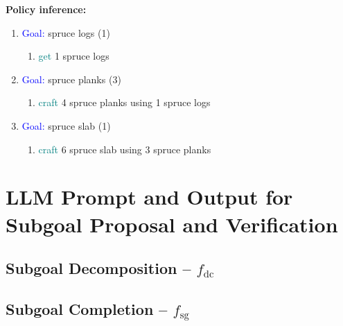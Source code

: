 \textbf{Policy inference:}
\begin{enumerate}[label=\textbf{Manager :}, leftmargin=2.4em, labelsep=.5em, align=left]
    \item \textcolor{blue}{Goal:} spruce logs (1)
    \begin{enumerate}[label=\textbf{Employee :}, leftmargin=2.8em, labelsep=.5em, align=left]
        \item \textcolor{teal}{get} 1 spruce logs
    \end{enumerate}

    \item \textcolor{blue}{Goal:} spruce planks (3)
    \begin{enumerate}[label=\textbf{Employee :}, leftmargin=2.8em, labelsep=.5em, align=left]
        \item \textcolor{teal}{craft} 4 spruce planks using 1 spruce logs
    \end{enumerate}

    \item \textcolor{blue}{Goal:} spruce slab (1)
    \begin{enumerate}[label=\textbf{Employee :}, leftmargin=2.8em, labelsep=.5em, align=left]
        \item \textcolor{teal}{craft} 6 spruce slab using 3 spruce planks
    \end{enumerate}
\end{enumerate}

\section[appx]{LLM Prompt and Output for Subgoal Proposal and Verification}
\label{appx:llm_prompt_outputs}
\subsection{Subgoal Decomposition -- \texorpdfstring{$f_\text{dc}$}{f\_dc}}

\subsection{Subgoal Completion -- \texorpdfstring{$f_\text{sg}$}{f\_}}

\newpage

%

